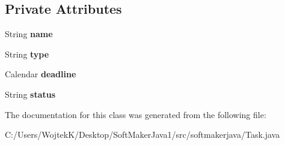 \subsection*{Private Attributes}
\begin{DoxyCompactItemize}
\item 
String {\bfseries name}\hypertarget{classsoftmakerjava_1_1_task_a55d0f97f41eb8b991acc7ec7a63744c8}{}\label{classsoftmakerjava_1_1_task_a55d0f97f41eb8b991acc7ec7a63744c8}

\item 
String {\bfseries type}\hypertarget{classsoftmakerjava_1_1_task_a8f23833bcc2220df044937de9fd04337}{}\label{classsoftmakerjava_1_1_task_a8f23833bcc2220df044937de9fd04337}

\item 
Calendar {\bfseries deadline}\hypertarget{classsoftmakerjava_1_1_task_a9bef5960037c78ba0a9b343843139231}{}\label{classsoftmakerjava_1_1_task_a9bef5960037c78ba0a9b343843139231}

\item 
String {\bfseries status}\hypertarget{classsoftmakerjava_1_1_task_af9414cf564efce8fa4cc15d1661e5d0d}{}\label{classsoftmakerjava_1_1_task_af9414cf564efce8fa4cc15d1661e5d0d}

\end{DoxyCompactItemize}


The documentation for this class was generated from the following file\+:\begin{DoxyCompactItemize}
\item 
C\+:/\+Users/\+Wojtek\+K/\+Desktop/\+Soft\+Maker\+Java1/src/softmakerjava/Task.\+java\end{DoxyCompactItemize}
